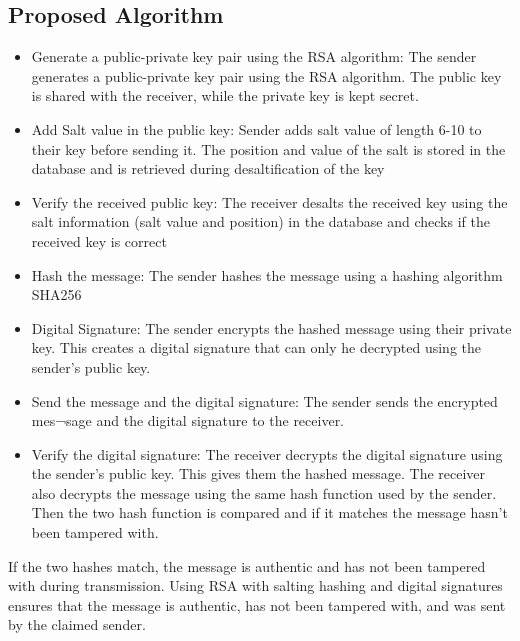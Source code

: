 \subsection*{Proposed Algorithm}
\vspace{-18pt}
\begin{itemize}
	\item Generate a public-private key pair using the RSA algorithm: The sender generates a public-private key pair using the RSA algorithm.
	      The public key is shared with the receiver, while the private key is kept secret.
	\item Add Salt value in the public key: Sender adds salt value of length 6-10 to their key before sending it.
	      The position and value of the salt is stored in the database and is retrieved during desaltification of the key
	\item Verify the received public key: The receiver desalts the received key using the salt information (salt value and position) in the database
	      and checks if the received key is correct
	\item Hash the message: The sender hashes the message using a hashing algorithm SHA256
	\item Digital Signature: The sender encrypts the hashed message using their private key. This creates a digital signature
	      that can only he decrypted using the sender's public key.
	\item Send the message and the digital signature: The sender sends the encrypted mes¬sage and the digital signature to the receiver.
	\item Verify the digital signature: The receiver decrypts the digital signature using the sender's public key.
	      This gives them the hashed message. The receiver also decrypts the message using the same hash function used by the sender.
	      Then the two hash function is compared and if it matches the message hasn't been tampered with.

\end{itemize}
If the two hashes match, the message is authentic and has not been tampered with during transmission.
Using RSA with salting hashing and digital signatures ensures that the message is authentic, has not been tampered with,
and was sent by the claimed sender.
